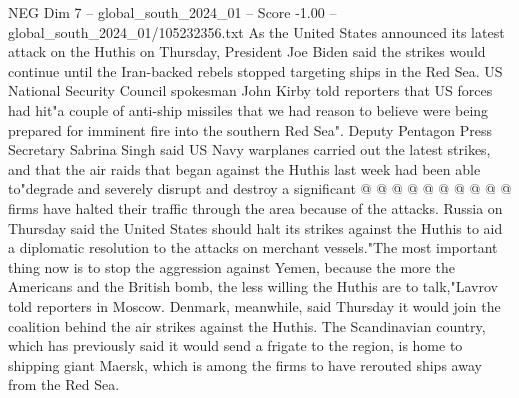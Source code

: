 \begin{textsample}{NEG Dim 7 – global\_south\_2024\_01 – Score -1.00 – global\_south\_2024\_01/105232356.txt}
As the United States announced its latest attack on the Huthis on Thursday, President Joe Biden said the strikes would continue until the Iran-backed rebels stopped targeting ships in the Red Sea.
US National Security Council spokesman John Kirby told reporters that US forces had hit"a couple of anti-ship missiles that we had reason to believe were being prepared for imminent fire into the southern Red Sea".
Deputy Pentagon Press Secretary Sabrina Singh said US Navy warplanes carried out the latest strikes, and that the air raids that began against the Huthis last week had been able to"degrade and severely disrupt and destroy a significant @ @ @ @ @ @ @ @ @ @ firms have halted their traffic through the area because of the attacks.
Russia on Thursday said the United States should halt its strikes against the Huthis to aid a diplomatic resolution to the attacks on merchant vessels."The most important thing now is to stop the aggression against Yemen, because the more the Americans and the British bomb, the less willing the Huthis are to talk,"Lavrov told reporters in Moscow.
Denmark, meanwhile, said Thursday it would join the coalition behind the air strikes against the Huthis.
The Scandinavian country, which has previously said it would send a frigate to the region, is home to shipping giant Maersk, which is among the firms to have rerouted ships away from the Red Sea.

\end{textsample}
